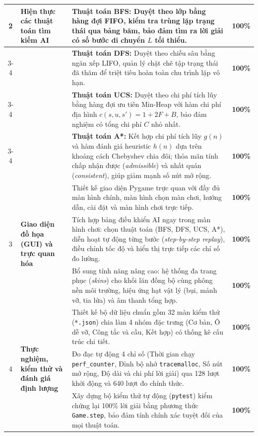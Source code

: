 \begin{center}
\begin{tabularx}{\textwidth}{|c|p{}|X|c|}
\multirow{4}{*}{2} & \multirow{4}{=}{\textbf{Hiện thực các thuật toán tìm kiếm AI}} 
& \textbf{Thuật toán BFS:} Duyệt theo lớp bằng hàng đợi FIFO, kiểm tra trùng lặp trạng thái qua bảng băm, bảo đảm tìm ra lời giải có số bước di chuyển $L$ tối thiểu. & \textbf{100\%} \\
\cline{3-4}
& & \textbf{Thuật toán DFS:} Duyệt theo chiều sâu bằng ngăn xếp LIFO, quản lý chặt chẽ tập trạng thái đã thăm để triệt tiêu hoàn toàn chu trình lặp vô hạn. & \textbf{100\%} \\
\cline{3-4}
& & \textbf{Thuật toán UCS:} Duyệt theo chi phí tích lũy bằng hàng đợi ưu tiên Min-Heap với hàm chi phí địa hình $c(s, u, s') = 1 + 2F + B$, bảo đảm nghiệm có tổng chi phí $C$ nhỏ nhất. & \textbf{100\%} \\
\cline{3-4}
& & \textbf{Thuật toán A*:} Kết hợp chi phí tích lũy $g(n)$ và hàm đánh giá heuristic $h(n)$ dựa trên khoảng cách Chebyshev chia đôi; thỏa mãn tính chấp nhận được (\textit{admissible}) và nhất quán (\textit{consistent}), giúp giảm mạnh số nút mở rộng. & \textbf{100\%} \\
\hline

\multirow{3}{*}{3} & \multirow{3}{=}{\textbf{Giao diện đồ họa (GUI) và trực quan hóa}} 
& Thiết kế giao diện Pygame trực quan với đầy đủ màn hình chính, màn hình chọn màn chơi, hướng dẫn, cài đặt và màn hình chơi trực tiếp. & \textbf{100\%} \\
\cline{3-4}
& & Tích hợp bảng điều khiển AI ngay trong màn hình chơi: chọn thuật toán (BFS, DFS, UCS, A*), diễn hoạt tự động từng bước (\textit{step-by-step replay}), điều chỉnh tốc độ và hiển thị trực tiếp các chỉ số đo lường. & \textbf{100\%} \\
\cline{3-4}
& & Bổ sung tính năng nâng cao: hệ thống đa trang phục (\textit{skins}) cho khối lăn đồng bộ cùng phông nền môi trường, hiệu ứng hạt vật lý (bụi, mảnh vỡ, tia lửa) và âm thanh tổng hợp. & \textbf{100\%} \\
\hline

\multirow{3}{*}{4} & \multirow{3}{=}{\textbf{Thực nghiệm, kiểm thử và đánh giá định lượng}} 
& Thiết kế bộ dữ liệu chuẩn gồm 32 màn kiểm thử (\texttt{*.json}) chia làm 4 nhóm đặc trưng (Cơ bản, Ô dễ vỡ, Công tắc và cầu, Kết hợp) có thống kê cấu trúc chi tiết. & \textbf{100\%} \\
\cline{3-4}
& & Đo đạc tự động 4 chỉ số (Thời gian chạy \texttt{perf\_counter}, Đỉnh bộ nhớ \texttt{tracemalloc}, Số nút mở rộng, Độ dài và chi phí lời giải) qua 128 lượt khởi động và 640 lượt đo chính thức. & \textbf{100\%} \\
\cline{3-4}
& & Xây dựng bộ kiểm thử tự động (\texttt{pytest}) kiểm chứng lại 100\% lời giải bằng phương thức \texttt{Game.step}, bảo đảm tính chính xác tuyệt đối của mọi thuật toán. & \textbf{100\%} \\
\hline


\end{tabularx}
\end{center}
